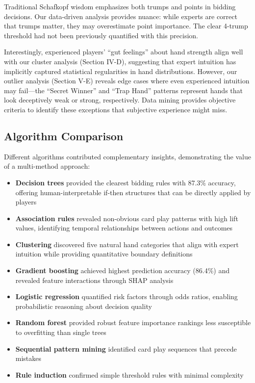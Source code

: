 \documentclass[conference]{IEEEtran}
\begin{document}
Traditional Schafkopf wisdom emphasizes both trumps and points in bidding decisions. Our data-driven analysis provides nuance: while experts are correct that trumps matter, they may overestimate point importance. The clear 4-trump threshold had not been previously quantified with this precision.

Interestingly, experienced players' ``gut feelings'' about hand strength align well with our cluster analysis (Section IV-D), suggesting that expert intuition has implicitly captured statistical regularities in hand distributions. However, our outlier analysis (Section V-E) reveals edge cases where even experienced intuition may fail---the ``Secret Winner'' and ``Trap Hand'' patterns represent hands that look deceptively weak or strong, respectively. Data mining provides objective criteria to identify these exceptions that subjective experience might miss.

\subsection{Algorithm Comparison}

Different algorithms contributed complementary insights, demonstrating the value of a multi-method approach:

\begin{itemize}
    \item \textbf{Decision trees} provided the clearest bidding rules with 87.3\% accuracy, offering human-interpretable if-then structures that can be directly applied by players
    \item \textbf{Association rules} revealed non-obvious card play patterns with high lift values, identifying temporal relationships between actions and outcomes
    \item \textbf{Clustering} discovered five natural hand categories that align with expert intuition while providing quantitative boundary definitions
    \item \textbf{Gradient boosting} achieved highest prediction accuracy (86.4\%) and revealed feature interactions through SHAP analysis
    \item \textbf{Logistic regression} quantified risk factors through odds ratios, enabling probabilistic reasoning about decision quality
    \item \textbf{Random forest} provided robust feature importance rankings less susceptible to overfitting than single trees
    \item \textbf{Sequential pattern mining} identified card play sequences that precede mistakes
    \item \textbf{Rule induction} confirmed simple threshold rules with minimal complexity
\end{itemize}
\end{document}
